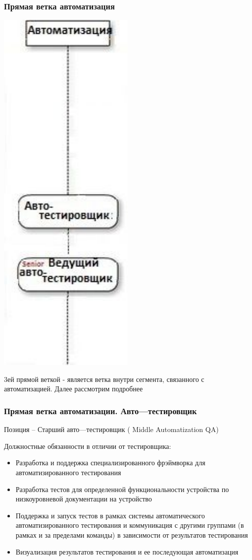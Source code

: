 \documentclass{../industrial-development}
\begin{document}
\begin{frame} \frametitle{Прямая ветка автоматизация }
  \centerline{\includegraphics[width=0.27\linewidth]{11-IT-specialist's-way/sch11c.pdf}}
\end{frame}

\lecturenotes
 3ей прямой веткой  - является ветка внутри сегмента, связанного с автоматизацией. Далее рассмотрим подробнее

\begin{frame} \frametitle{Прямая ветка автоматизации. Авто---тестировщик }
 \begin{block}{}
  \alert{Позиция – Старший авто---тестировщик ( Middle Automatization QA)}

Должностные обязанности в отличии от тестировщика: 
  \end{block}
  \begin{itemize}
  \item Разработка и поддержка специализированного фрэймворка для автоматизированного тестирования
  \item  Разработка тестов для определенной функциональности устройства по низкоуровневой документации на устройство
  \item Поддержка и запуск тестов в рамках системы автоматического автоматизированного тестирования и коммуникация с другими группами (в рамках и за пределами команды) в зависимости от результатов тестирования
 \item  Визуализация результатов тестирования и ее последующая автоматизация
  \end{itemize}
\end{frame}
\end{document}
